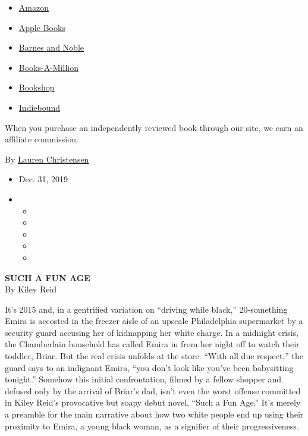 \begin{itemize}
\tightlist
\item
  \href{https://www.amazon.com/gp/search?index=books\&tag=NYTBSREV-20\&field-keywords=Such+a+Fun+Age+Kiley+Reid}{Amazon}
\item
  \href{https://du-gae-books-dot-nyt-du-prd.appspot.com/buy?title=Such+a+Fun+Age\&author=Kiley+Reid}{Apple
  Books}
\item
  \href{https://www.anrdoezrs.net/click-7990613-11819508?url=https\%3A\%2F\%2Fwww.barnesandnoble.com\%2Fw\%2F\%3Fean\%3D9780525541905}{Barnes
  and Noble}
\item
  \href{https://www.anrdoezrs.net/click-7990613-35140?url=https\%3A\%2F\%2Fwww.booksamillion.com\%2Fp\%2FSuch\%2Ba\%2BFun\%2BAge\%2FKiley\%2BReid\%2F9780525541905}{Books-A-Million}
\item
  \href{https://bookshop.org/a/3546/9780525541905}{Bookshop}
\item
  \href{https://www.indiebound.org/book/9780525541905?aff=NYT}{Indiebound}
\end{itemize}

When you purchase an independently reviewed book through our site, we
earn an affiliate commission.

By \href{https://www.nytimes.com/by/lauren-christensen}{Lauren
Christensen}

\begin{itemize}
\item
  Dec. 31, 2019
\item
  \begin{itemize}
  \item
  \item
  \item
  \item
  \item
  \end{itemize}
\end{itemize}

\textbf{SUCH A FUN AGE}\\
By Kiley Reid

It's 2015 and, in a gentrified variation on ``driving while black,''
20-something Emira is accosted in the freezer aisle of an upscale
Philadelphia supermarket by a security guard accusing her of kidnapping
her white charge. In a midnight crisis, the Chamberlain household has
called Emira in from her night off to watch their toddler, Briar. But
the real crisis unfolds at the store. ``With all due respect,'' the
guard says to an indignant Emira, ``you don't look like you've been
babysitting tonight.'' Somehow this initial confrontation, filmed by a
fellow shopper and defused only by the arrival of Briar's dad, isn't
even the worst offense committed in Kiley Reid's provocative but soapy
debut novel, ``Such a Fun Age.'' It's merely a preamble for the main
narrative about how two white people end up using their proximity to
Emira, a young black woman, as a signifier of their progressiveness.

